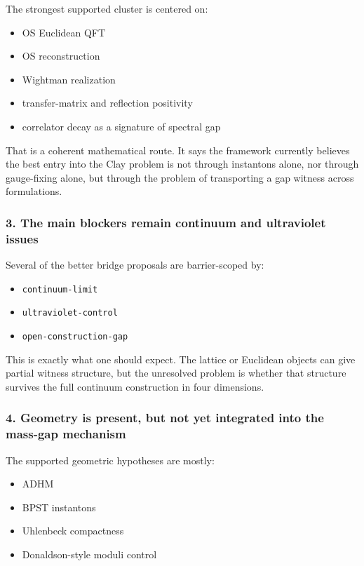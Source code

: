 \documentclass[
]{article}
\providecommand{\tightlist}{%
  \setlength{\itemsep}{0pt}\setlength{\parskip}{0pt}}
\begin{document}
The strongest supported cluster is centered on:

\begin{itemize}
\tightlist
\item
  OS Euclidean QFT
\item
  OS reconstruction
\item
  Wightman realization
\item
  transfer-matrix and reflection positivity
\item
  correlator decay as a signature of spectral gap
\end{itemize}

That is a coherent mathematical route. It says the framework currently
believes the best entry into the Clay problem is not through instantons
alone, nor through gauge-fixing alone, but through the problem of
transporting a gap witness across formulations.

\subsubsection{3. The main blockers remain continuum and ultraviolet
issues}\label{3-the-main-blockers-remain-continuum-and-ultraviolet-issues}

Several of the better bridge proposals are barrier-scoped by:

\begin{itemize}
\tightlist
\item
  \texttt{continuum-limit}
\item
  \texttt{ultraviolet-control}
\item
  \texttt{open-construction-gap}
\end{itemize}

This is exactly what one should expect. The lattice or Euclidean objects
can give partial witness structure, but the unresolved problem is
whether that structure survives the full continuum construction in four
dimensions.

\subsubsection{4. Geometry is present, but not yet integrated into the
mass-gap
mechanism}\label{4-geometry-is-present-but-not-yet-integrated-into-the-mass-gap-mechanism}

The supported geometric hypotheses are mostly:

\begin{itemize}
\tightlist
\item
  ADHM
\item
  BPST instantons
\item
  Uhlenbeck compactness
\item
  Donaldson-style moduli control
\end{itemize}
\end{document}
